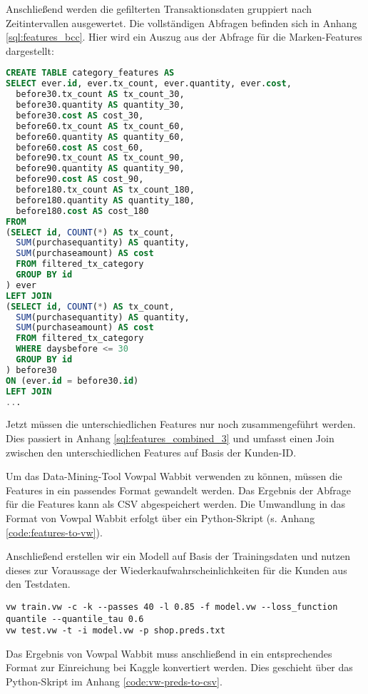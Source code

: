Anschließend werden die gefilterten Transaktionsdaten gruppiert nach
Zeitintervallen ausgewertet. Die vollständigen Abfragen befinden sich
in Anhang \ref{sql:features_bcc}. Hier wird ein Auszug aus der
Abfrage für die Marken-Features dargestellt:
\begin{lstlisting}[language=SQL]
CREATE TABLE category_features AS
SELECT ever.id, ever.tx_count, ever.quantity, ever.cost,
  before30.tx_count AS tx_count_30,
  before30.quantity AS quantity_30,
  before30.cost AS cost_30,
  before60.tx_count AS tx_count_60,
  before60.quantity AS quantity_60,
  before60.cost AS cost_60,
  before90.tx_count AS tx_count_90,
  before90.quantity AS quantity_90,
  before90.cost AS cost_90,
  before180.tx_count AS tx_count_180,
  before180.quantity AS quantity_180,
  before180.cost AS cost_180
FROM 
(SELECT id, COUNT(*) AS tx_count, 
  SUM(purchasequantity) AS quantity, 
  SUM(purchaseamount) AS cost
  FROM filtered_tx_category
  GROUP BY id
) ever
LEFT JOIN
(SELECT id, COUNT(*) AS tx_count, 
  SUM(purchasequantity) AS quantity, 
  SUM(purchaseamount) AS cost
  FROM filtered_tx_category
  WHERE daysbefore <= 30
  GROUP BY id
) before30
ON (ever.id = before30.id)
LEFT JOIN
...
\end{lstlisting}

Jetzt müssen die unterschiedlichen Features nur noch zusammengeführt werden. Dies passiert
in Anhang \ref{sql:features_combined_3} und umfasst einen Join zwischen den
unterschiedlichen Features auf Basis der Kunden-ID.

Um das Data-Mining-Tool Vowpal Wabbit verwenden zu können, müssen die Features in ein
passendes Format gewandelt werden. Das Ergebnis der Abfrage für die Features kann
als CSV abgespeichert werden. Die Umwandlung in das Format von Vowpal Wabbit
erfolgt über ein Python-Skript (s. Anhang \ref{code:features-to-vw}).

Anschließend erstellen wir ein Modell auf Basis der Trainingsdaten und nutzen dieses
zur Voraussage der Wiederkaufwahrscheinlichkeiten für die Kunden aus den Testdaten.
\begin{lstlisting}
vw train.vw -c -k --passes 40 -l 0.85 -f model.vw --loss_function quantile --quantile_tau 0.6
vw test.vw -t -i model.vw -p shop.preds.txt
\end{lstlisting}

Das Ergebnis von Vowpal Wabbit muss anschließend in ein entsprechendes Format zur Einreichung bei 
Kaggle konvertiert werden. Dies geschieht über das Python-Skript im Anhang 
\ref{code:vw-preds-to-csv}. 

